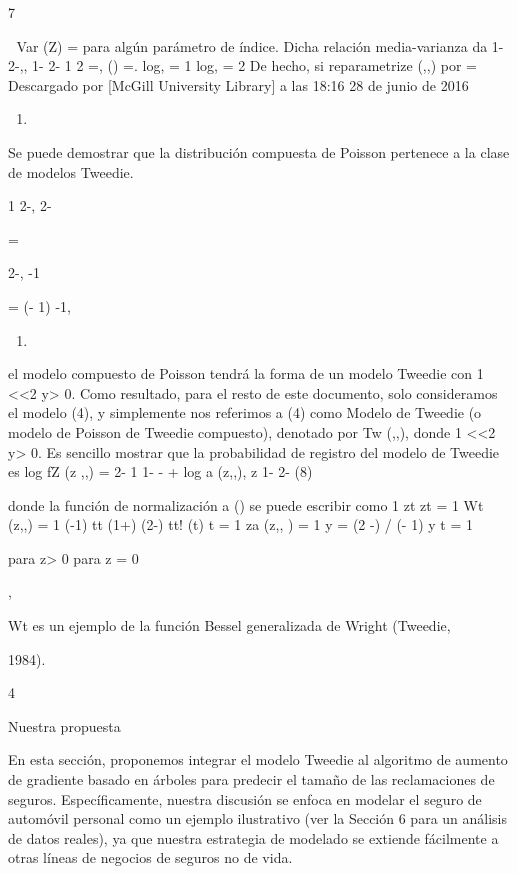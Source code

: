 \documentclass[]{article}
\begin{document}
7

 Var (Z) = para algún parámetro de índice. Dicha relación
media-varianza da 1- 2-,, 1- 2- 1 2 =, () =. log, = 1 log, = 2 De hecho,
si reparametrize (,,) por = Descargado por {[}McGill University
Library{]} a las 18:16 28 de junio de 2016

\begin{enumerate}
\def\labelenumi{(\arabic{enumi})}
\setcounter{enumi}{5}
\item
\end{enumerate}

Se puede demostrar que la distribución compuesta de Poisson pertenece a
la clase de modelos Tweedie.

1 2-, 2-

=

2-, -1

= (- 1) -1,

\begin{enumerate}
\def\labelenumi{(\arabic{enumi})}
\setcounter{enumi}{6}
\item
\end{enumerate}

el modelo compuesto de Poisson tendrá la forma de un modelo Tweedie con
1 \textless{}\textless{}2 y\textgreater{} 0. Como resultado, para el
resto de este documento, solo consideramos el modelo (4), y simplemente
nos referimos a (4) como Modelo de Tweedie (o modelo de Poisson de
Tweedie compuesto), denotado por Tw (,,), donde 1
\textless{}\textless{}2 y\textgreater{} 0. Es sencillo mostrar que la
probabilidad de registro del modelo de Tweedie es log fZ (z
\textbar{},,) = 2- 1 1- - + log a (z,,), z 1- 2- (8)

donde la función de normalización a () se puede escribir como 1 zt zt =
1 Wt (z,,) = 1 (-1) tt (1+) (2-) tt! (t) t = 1 za (z,, ) = 1 y = (2 -) /
(- 1) y t = 1

para z\textgreater{} 0 para z = 0

,

Wt es un ejemplo de la función Bessel generalizada de Wright (Tweedie,

1984).

4

Nuestra propuesta

En esta sección, proponemos integrar el modelo Tweedie al algoritmo de
aumento de gradiente basado en árboles para predecir el tamaño de las
reclamaciones de seguros. Específicamente, nuestra discusión se enfoca
en modelar el seguro de automóvil personal como un ejemplo ilustrativo
(ver la Sección 6 para un análisis de datos reales), ya que nuestra
estrategia de modelado se extiende fácilmente a otras líneas de negocios
de seguros no de vida.
\end{document}
